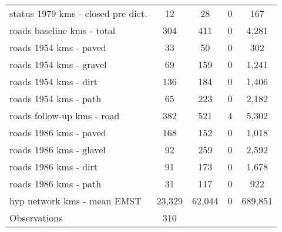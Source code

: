 \begin{table}[htbp]
\begin{tabular}{l*{1}{cccc}}
status 1979 kms - closed pre dict.&          12&          28&           0&         167\\
roads baseline kms - total&         304&         411&           0&       4,281\\
roads 1954 kms - paved&          33&          50&           0&         302\\
roads 1954 kms - gravel&          69&         159&           0&       1,241\\
roads 1954 kms - dirt&         136&         184&           0&       1,406\\
roads 1954 kms - path&          65&         223&           0&       2,182\\
roads follow-up kms - road&         382&         521&           4&       5,302\\
roads 1986 kms - paved&         168&         152&           0&       1,018\\
roads 1986 kms - glavel&          92&         259&           0&       2,592\\
roads 1986 kms - dirt&          91&         173&           0&       1,678\\
roads 1986 kms - path&          31&         117&           0&         922\\
hyp network kms - mean EMST &      23,329&      62,044&           0&     689,851\\
\hline
Observations        &         310&            &            &            \\
\hline\hline
\end{tabular}
\end{table}
